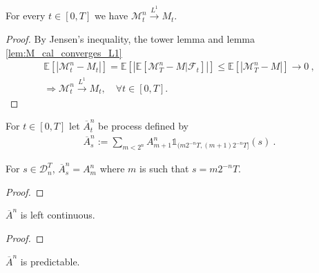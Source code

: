 \begin{lemma}\label{lem:M1_komlos}
  For every $t\in[0,T]$ we have $\mathcal{M}^n_t\stackrel{L^1}{\rightarrow}M_t$.
\end{lemma}

\begin{proof}
By Jensen's inequality, the tower lemma and lemma \ref{lem:M_cal_converges_L1}
\begin{gather}\nonumber
  \mathbb{E}[|\mathcal{M}^n_t-M_t|]
  = \mathbb{E}[|\mathbb{E}[\mathcal{M}^n_T-M\vert\mathcal{F}_t]|]
  \le \mathbb{E}[|\mathcal{M}^n_T-M|]\rightarrow0 \: ,
  \\
  \Rightarrow \mathcal{M}^n_t\stackrel{L^1}{\rightarrow} M_t,\quad \forall t\in[0,T].\label{equation_DM_e7}
\end{gather}
\end{proof}


\begin{definition}\label{def:barA}
For $t\in[0,T]$ let $\overline{A}^n_t$ be process defined by
\begin{align*}
  \overline{A}^n_s
  := \sum_{m < 2^n} A^n_{m+1} \mathbb{1}_{(m2^{-n}T, (m+1)2^{-n}T]}(s)
  \: .
\end{align*}

\end{definition}


\begin{lemma}\label{lem:barA_eq}
For $s \in \mathcal{D}^T_n$, $\overline{A}^n_s = A^n_m$ where $m$ is such that $s = m2^{-n}T$.
\end{lemma}

\begin{proof}

\end{proof}


\begin{lemma}\label{lem:leftContinuous_barA}
$\overline{A}^n$ is left continuous.
\end{lemma}

\begin{proof}

\end{proof}


\begin{lemma}\label{lem:predictable_barA}
$\overline{A}^n$ is predictable.
\end{lemma}

